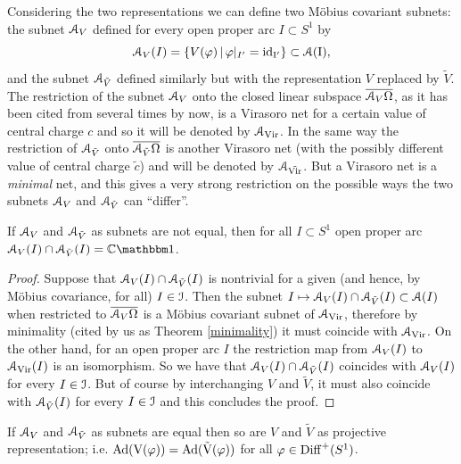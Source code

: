 \documentclass[12pt]{article}
\begin{document}
Considering the two representations we can define two M\"obius covariant
subnets: the subnet ${\mathcal A}_V$ defined for every open proper arc 
$I \subset S^1$ by
\begin{equation}
{\mathcal A}_V(I)=\{V(\varphi)\,|\,\varphi|_{I'}=\rm{id}_{I'}\} \subset {\mathcal A}(I),
\end{equation}
and the subnet ${\mathcal A}_{\tilde{V}}$ defined similarly but with the
representation $V$ replaced by $\tilde{V}$. The restriction of the subnet
${\mathcal A}_V$ onto the closed linear subspace $\overline{{\mathcal A}_V\Omega}$, as it has
been cited from \cite{Carpi03b} several times by now, is a Virasoro net 
for a certain value of central charge $c$ and so it will be denoted by
${\mathcal A}_{\rm{Vir}}$.  In the same way the restriction of ${\mathcal A}_{\tilde{V}}$ onto 
$\overline{{\mathcal A}_{\tilde{V}}\Omega}$ is another Virasoro net 
(with the possibly different value of central charge
$\tilde{c}$) and will be denoted by ${\mathcal A}_{\tilde{\rm Vir}}$. But a
Virasoro net is a {\it minimal} net, and this gives a very
strong restriction on the possible ways the two subnets ${\mathcal A}_V$ and
${\mathcal A}_{\tilde{V}}$ can ``differ''.
\begin{proposition}
\label{localintersection1}
If ${\mathcal A}_V$ and ${\mathcal A}_{\tilde{V}}$ as subnets are not equal, then
for all $I \subset S^1$ open proper arc
$\A_V(I) \cap \A_{\tilde{V}}(I) = \CC {\mathbbm 1}$.
\end{proposition}
\begin{proof} Suppose that ${\mathcal A}_V(I) \cap {\mathcal A}_{\tilde{V}}(I)$ is nontrivial 
for  a given (and hence, by M\"obius covariance, for all) $I\in {\mathcal I}$. 
Then the subnet $I \mapsto {\mathcal A}_V(I) \cap {\mathcal A}_{\tilde{V}}(I) \subset {\mathcal A}(I)$ 
when restricted to $\overline{{\mathcal A}_V\Omega}$ is a M\"obius covariant 
subnet of ${\mathcal A}_{\rm{Vir}}$, therefore by minimality (cited by us as Theorem
\ref{minimality}) it must coincide with ${\mathcal A}_{\rm Vir}$. 
On the other hand, for an open proper arc $I$ the restriction map from
${\mathcal A}_V(I)$ to ${\mathcal A}_{\rm{Vir}}(I)$ is an isomorphism. 
So we have that ${\mathcal A}_V(I) \cap {\mathcal A}_{\tilde{V}}(I)$ coincides with
${\mathcal A}_V(I)$ for every $I\in {\mathcal I}$. 
But of course by interchanging $V$ and $\tilde{V}$, it must also coincide 
with ${\mathcal A}_{\tilde{V}}(I)$  for every $I\in {\mathcal I}$ and this concludes the 
proof.
\end{proof}
\begin{proposition}
\label{localintersection2}
If ${\mathcal A}_V$ and ${\mathcal A}_{\tilde{V}}$ as subnets are equal then so are 
$V$ and $\tilde{V}$ as projective representation; i.e. 
$\rm{Ad}(V(\varphi))=\rm{Ad}(\tilde{V}(\varphi))$
for all $\varphi \in {{\rm Diff}^+(S^1)}$.
\end{proposition}
\end{document}

